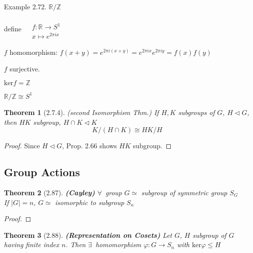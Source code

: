 \documentclass[twoside,landscape]{amsart}
\theoremstyle{plain}
\newtheorem{theorem}{Theorem}
\theoremstyle{definition}
\theoremstyle{remark}
\begin{document}
\begin{multicols*}{2}
Example 2.72.  
$\mathbb{R}/\mathbb{Z}$

define $ \begin{aligned} & \quad \\ 
  & f: \mathbb{R} \to S^1 \\
  & x\mapsto e^{2\pi i x} \end{aligned}$

$f$ homomorphism: $f(x+y) = e^{2\pi i (x+y)} = e^{2\pi i x} e^{2\pi i y} = f(x) f(y)$

$f$ surjective.  

$\text{ker}{f} = \mathbb{Z}$

$\mathbb{R}/\mathbb{Z} \cong S^1$

\begin{theorem}[2.7.4] (second Isomorphism Thm.)
If $H,K$ subgroups of $G$, $H \lhd G$, \\
\quad then $HK$ subgroup, $H \cap K \lhd K$
\[
K/(H \cap K) \cong HK/ H
\]
\end{theorem}

\begin{proof} Since $H \lhd G$, Prop. 2.66 shows $HK$ subgroup. 










\end{proof}





\subsection{Group Actions}

\begin{theorem}[2.87] \textbf{(Cayley)} $\forall \, $ group $G \simeq $ subgroup of symmetric group $S_G$ \\
If $|G| = n$, $G \simeq $ isomorphic to subgroup $S_n$ 
\end{theorem}

\begin{proof}

\end{proof}

\begin{theorem}[2.88] \textbf{(Representation on Cosets)} Let $G$, $H$ subgroup of $G$ having finite index $n$.  Then $\exists \, $ homomorphism $\varphi:G \to S_n$ with $\text{ker}{\varphi} \leq H$
\end{theorem}



\end{multicols*}
\end{document}
